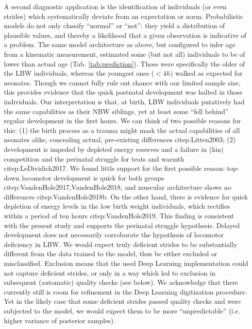 \bigskip
A second diagnostic application is the identification of individuals (or even strides) which systematically deviate from an expectation or norm.
Probabilistic models do not only classify ``normal'' or ``not'': they yield a distribution of plausible values, and thereby a likelihood that a given observation is indicative of a problem.
The same model architecture as above, but configured to infer age from a kinematic measurement, estimated some (but not all) individuals to be of lower than actual age (Tab. \ref{tab:prediction}).
Those were specifically the older of the LBW individuals, whereas the youngest ones (\(<4h\)) walked as expected for neonates.
Though we cannot fully rule out chance with our limited sample size, this provides evidence that the quick postnatal development was halted in those individuals.
Our interpretation is that, at birth, LBW individuals putatively had the same capabilities as their NBW siblings, yet at least some ``fell behind'' regular development in the first hours.
We can think of two possible reasons for this: (1) the birth process as a trauma might mask the actual capabilities of all neonates alike, concealing actual, pre-existing differences citep:Litten2003; (2) development is impeded by depleted energy reserves and a failure in (kin) competition and the perinatal struggle for teats and warmth citep:LeDividich2017.
We found little support for the first possible reason: top-down locomotor development is quick for both groups citep:VandenHole2017,VandenHole2018, and muscular architecture shows no differences citep:VandenHole2018b.
On the other hand, there is evidence for quick depletion of energy levels in the low birth weight individuals, which rectifies within a period of ten hours citep:VandenHole2019.
This finding is consistent with the present study and supports the perinatal struggle hypothesis.
Delayed development does not necessarily corroborate the hypothesis of locomotor deficiency in LBW.
We would expect truly deficient strides to be substantially different from the data trained to the model, thus be either excluded or misclassified.
Exclusion means that the used Deep Learning implementation could not capture deficient strides, or only in a way which led to exclusion in subsequent (automatic) quality checks (see below).
We acknowledge that there currently still is room for refinement in the Deep Learning digitization procedure.
Yet in the likely case that some deficient strides passed quality checks and were subjected to the model, we would expect them to be more ``unpredictable'' (i.e. higher variance of posterior samples).
